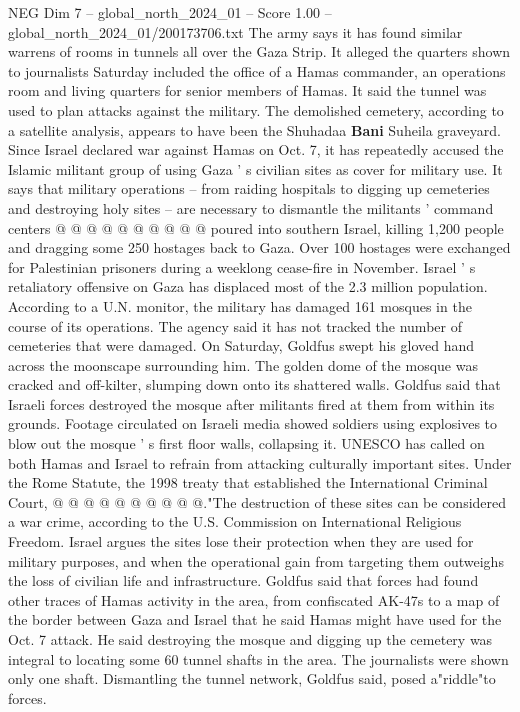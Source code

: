 \begin{textsample}{NEG Dim 7 – global\_north\_2024\_01 – Score 1.00 – global\_north\_2024\_01/200173706.txt}
The army says it has found similar warrens of rooms in tunnels all over the Gaza Strip.
It alleged the quarters shown to journalists Saturday included the office of a Hamas commander, an operations room and living quarters for senior members of Hamas.
It said the tunnel was used to plan attacks against the military.
The demolished cemetery, according to a satellite analysis, appears to have been the Shuhadaa \textbf{Bani} Suheila graveyard.
Since Israel declared war against Hamas on Oct. 7, it has repeatedly accused the Islamic militant group of using Gaza ' s civilian sites as cover for military use.
It says that military operations -- from raiding hospitals to digging up cemeteries and destroying holy sites -- are necessary to dismantle the militants ' command centers @ @ @ @ @ @ @ @ @ @ poured into southern Israel, killing 1,200 people and dragging some 250 hostages back to Gaza.
Over 100 hostages were exchanged for Palestinian prisoners during a weeklong cease-fire in November.
Israel ' s retaliatory offensive on Gaza has displaced most of the 2.3 million population.
According to a U.N. monitor, the military has damaged 161 mosques in the course of its operations.
The agency said it has not tracked the number of cemeteries that were damaged.
On Saturday, Goldfus swept his gloved hand across the moonscape surrounding him.
The golden dome of the mosque was cracked and off-kilter, slumping down onto its shattered walls.
Goldfus said that Israeli forces destroyed the mosque after militants fired at them from within its grounds.
Footage circulated on Israeli media showed soldiers using explosives to blow out the mosque ' s first floor walls, collapsing it.
UNESCO has called on both Hamas and Israel to refrain from attacking culturally important sites.
Under the Rome Statute, the 1998 treaty that established the International Criminal Court, @ @ @ @ @ @ @ @ @ @."The destruction of these sites can be considered a war crime, according to the U.S.
Commission on International Religious Freedom.
Israel argues the sites lose their protection when they are used for military purposes, and when the operational gain from targeting them outweighs the loss of civilian life and infrastructure.
Goldfus said that forces had found other traces of Hamas activity in the area, from confiscated AK-47s to a map of the border between Gaza and Israel that he said Hamas might have used for the Oct. 7 attack.
He said destroying the mosque and digging up the cemetery was integral to locating some 60 tunnel shafts in the area.
The journalists were shown only one shaft.
Dismantling the tunnel network, Goldfus said, posed a"riddle"to forces.

\end{textsample}
